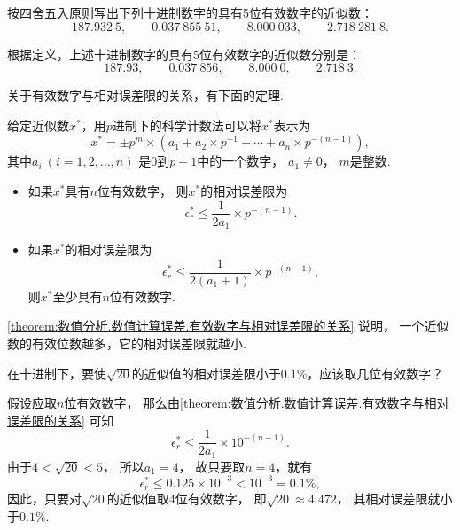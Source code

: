 \begin{example}
按四舍五入原则写出下列十进制数字的具有5位有效数字的近似数：\begin{equation*}
	187.932~5, \qquad
	0.037~855~51, \qquad
	8.000~033, \qquad
	2.718~281~8.
\end{equation*}
\begin{solution}
根据定义，上述十进制数字的具有5位有效数字的近似数分别是：\begin{equation*}
	187.93, \qquad
	0.037~856, \qquad
	8.000~0, \qquad
	2.718~3.
\end{equation*}
\end{solution}
\end{example}

关于有效数字与相对误差限的关系，有下面的定理.
\begin{theorem}\label{theorem:数值分析.数值计算误差.有效数字与相对误差限的关系}
给定近似数\(x^*\)，用\(p\)进制下的科学计数法可以将\(x^*\)表示为\begin{equation*}
	x^*
	= \pm p^m \times (
		a_1
		+ a_2 \times p^{-1}
		+ \dotsb
		+ a_n \times p^{-(n-1)}
	),
\end{equation*}
其中\(a_i\ (i=1,2,\dotsc,n)\)
是\(0\)到\(p-1\)中的一个数字，
\(a_1\neq0\)，
\(m\)是整数.
\begin{itemize}
	\item 如果\(x^*\)具有\(n\)位有效数字，
	则\(x^*\)的相对误差限为\begin{equation}
		\epsilon^*_r
		\leq \frac1{2 a_1} \times p^{-(n-1)}.
	\end{equation}

	\item 如果\(x^*\)的相对误差限为\begin{equation*}
		\epsilon^*_r
		\leq \frac1{2(a_1+1)} \times p^{-(n-1)},
	\end{equation*}
	则\(x^*\)至少具有\(n\)位有效数字.
\end{itemize}
\end{theorem}
\cref{theorem:数值分析.数值计算误差.有效数字与相对误差限的关系} 说明，
一个近似数的有效位数越多，它的相对误差限就越小.

\begin{example}
在十进制下，要使\(\sqrt{20}\)的近似值的相对误差限小于\(0.1\%\)，应该取几位有效数字？
\begin{solution}
假设应取\(n\)位有效数字，
那么由\cref{theorem:数值分析.数值计算误差.有效数字与相对误差限的关系} 可知\begin{equation*}
	\epsilon^*_r \leq \frac1{2a_1} \times 10^{-(n-1)}.
\end{equation*}
由于\(4 < \sqrt{20} < 5\)，
所以\(a_1 = 4\)，
故只要取\(n = 4\)，就有\begin{equation*}
	\epsilon^*_r
	\leq 0.125 \times 10^{-3}
	< 10^{-3}
	= 0.1\%,
\end{equation*}
因此，只要对\(\sqrt{20}\)的近似值取4位有效数字，
即\(\sqrt{20} \approx 4.472\)，
其相对误差限就小于\(0.1\%\).
\end{solution}
\end{example}

